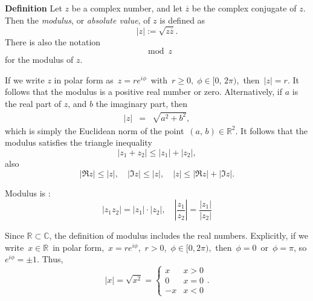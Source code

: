 \documentclass[12pt]{article}
\newcommand{\sR}[0]{\mathbb{R}}
\newcommand{\sC}[0]{\mathbb{C}}
\begin{document}
\newcommand{\ccj}[1]{\overline{#1}}
{\bf Definition} 
Let $z$ be a complex number, and let 
$\ccj{z}$ be the complex conjugate of $z$. 
Then the \emph{modulus}, or \emph{absolute value}, of $z$ is defined as 
\[
  |z| := \sqrt{z\ccj{z}}.
\]
There is also the notation
$$\mod{z}$$
for the modulus of $z$.

If we write $z$ in polar form as\, $z = re^{i\phi}$\, with\, $r\ge 0,\; \phi\in[0,\,2\pi)$,\,
then\, $|z| = r$.  It follows that the modulus is a positive real number or zero.  
Alternatively, if $a$ is the real part of $z$, and $b$ the imaginary part, then 
\begin{eqnarray}
\label{eq100}
|z| &=& \sqrt{a^2+b^2},
\end{eqnarray}
which is simply the Euclidean norm of the point \,$(a,\,b)\in \sR^2$. 
It follows that the modulus satisfies the triangle inequality
\[
   |z_1+z_2| \le |z_1|+|z_2|, 
\]
also
$$|\Re{z}| \le |z|,\quad |\Im{z}| \le |z|,\quad |z| \le |\Re{z}|+|\Im{z}|.$$

Modulus is :
$$|z_1z_2| = |z_1|\cdot|z_2|, \quad 
\left|\frac{z_1}{z_2}\right| = \frac{|z_1|}{|z_2|}$$



Since $\sR\subset\sC$, the definition of modulus includes the real numbers.  Explicitly, if we write\, $x\in\sR$\, in polar form,\, $x = re^{i\phi}$,\, $r > 0$,\, $\phi\in[0,2\pi)$,\, then\, $\phi = 0$\, or\, $\phi=\pi$, so\, $e^{i\phi}=\pm 1$.  Thus,
\[
  |x| = \sqrt{x^2} =
  \begin{cases}
    x  & x>0 \\
    0  & x=0 \\
    -x & x<0
  \end{cases}
.\]
\end{document}
